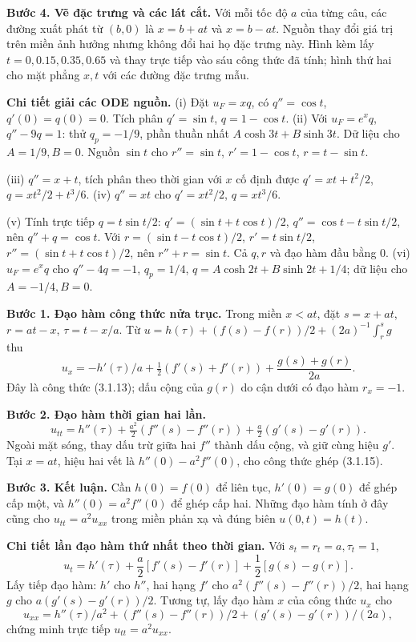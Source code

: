 \textbf{Bước 4. Vẽ đặc trưng và các lát cắt.} Với mỗi tốc độ $a$ của từng câu, các đường xuất phát từ $(b,0)$ là $x=b+at$ và $x=b-at$. Nguồn thay đổi giá trị trên miền ảnh hưởng nhưng không đổi hai họ đặc trưng này. Hình kèm lấy $t=0,0.15,0.35,0.65$ và thay trực tiếp vào sáu công thức đã tính; hình thứ hai cho mặt phẳng $x,t$ với các đường đặc trưng mẫu.

\textbf{Chi tiết giải các ODE nguồn.} (i) Đặt $u_F=xq$, có $q''=\cos t$, $q'(0)=q(0)=0$. Tích phân $q'=\sin t$, $q=1-\cos t$. (ii) Với $u_F=e^xq$, $q''-9q=1$: thử $q_p=-1/9$, phần thuần nhất $A\cosh3t+B\sinh3t$. Dữ liệu cho $A=1/9,B=0$. Nguồn $\sin t$ cho $r''=\sin t$, $r'=1-\cos t$, $r=t-\sin t$.

(iii) $q''=x+t$, tích phân theo thời gian với $x$ cố định được $q'=xt+t^2/2$, $q=xt^2/2+t^3/6$. (iv) $q''=xt$ cho $q'=xt^2/2$, $q=xt^3/6$.

(v) Tính trực tiếp $q=t\sin t/2$: $q'=(\sin t+t\cos t)/2$, $q''=\cos t-t\sin t/2$, nên $q''+q=\cos t$. Với $r=(\sin t-t\cos t)/2$, $r'=t\sin t/2$, $r''=(\sin t+t\cos t)/2$, nên $r''+r=\sin t$. Cả $q,r$ và đạo hàm đầu bằng $0$. (vi) $u_F=e^xq$ cho $q''-4q=-1$, $q_p=1/4$, $q=A\cosh2t+B\sinh2t+1/4$; dữ liệu cho $A=-1/4,B=0$.

\textbf{Bước 1. Đạo hàm công thức nửa trục.} Trong miền $x<at$, đặt $s=x+at$, $r=at-x$, $\tau=t-x/a$. Từ $u=h(\tau)+(f(s)-f(r))/2+(2a)^{-1}\int_r^s g$ thu
\[u_x=-h'(\tau)/a+\tfrac12(f'(s)+f'(r))+\frac{g(s)+g(r)}{2a}.\]
Đây là công thức (3.1.13); dấu cộng của $g(r)$ do cận dưới có đạo hàm $r_x=-1$.

\textbf{Bước 2. Đạo hàm thời gian hai lần.}
\[u_{tt}=h''(\tau)+\tfrac{a^2}2(f''(s)-f''(r))+\tfrac a2(g'(s)-g'(r)).\]
Ngoài mặt sóng, thay dấu trừ giữa hai $f''$ thành dấu cộng, và giữ cùng hiệu $g'$. Tại $x=at$, hiệu hai vết là $h''(0)-a^2f''(0)$, cho công thức ghép (3.1.15).

\textbf{Bước 3. Kết luận.} Cần $h(0)=f(0)$ để liên tục, $h'(0)=g(0)$ để ghép cấp một, và $h''(0)=a^2f''(0)$ để ghép cấp hai. Những đạo hàm tính ở đây cũng cho $u_{tt}=a^2u_{xx}$ trong miền phản xạ và đúng biên $u(0,t)=h(t)$.

\textbf{Chi tiết lần đạo hàm thứ nhất theo thời gian.} Với $s_t=r_t=a,\tau_t=1$,
\[u_t=h'(\tau)+\frac a2[f'(s)-f'(r)]+\frac12[g(s)-g(r)].\]
Lấy tiếp đạo hàm: $h'$ cho $h''$, hai hạng $f'$ cho $a^2(f''(s)-f''(r))/2$, hai hạng $g$ cho $a(g'(s)-g'(r))/2$. Tương tự, lấy đạo hàm $x$ của công thức $u_x$ cho
\[u_{xx}=h''(\tau)/a^2+(f''(s)-f''(r))/2+(g'(s)-g'(r))/(2a),\]
chứng minh trực tiếp $u_{tt}=a^2u_{xx}$.

